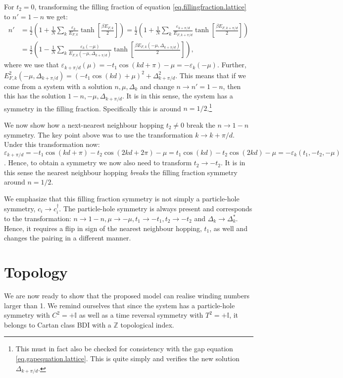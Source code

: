 For $t_2 = 0$, transforming the filling fraction of equation \eqref{eq.fillingfraction.lattice} to $n' = 1 - n$ we get:
\begin{align}
n' 	&= \frac{1}{2}\left(1 + \frac{1}{N}\sum_k \frac{\varepsilon_k}{E_{F,k}}\tanh\left[\frac{\beta E_{F,k}}{2} \right] \right) = \frac{1}{2}\left(1 + \frac{1}{N}\sum_k \frac{\varepsilon_{k + \pi/d}}{E_{F,k + \pi/d}}\tanh\left[\frac{\beta E_{F,k + \pi/d}}{2} \right] \right) \nonumber \\ 
	&= \frac{1}{2}\left(1 - \frac{1}{N}\sum_k \frac{\varepsilon_{k}(-\mu)}{E_{F,k}(-\mu, \Delta_{k + \pi/d})}\tanh\left[\frac{\beta E_{F,k}(-\mu, \Delta_{k + \pi/d})}{2} \right] \right), \nonumber
\end{align}
where we use that $\varepsilon_{k + \pi / d}( \mu ) = -t_1\cos(kd + \pi) - \mu = - \varepsilon_k(-\mu)$. Further, $E^2_{F,k}(-\mu, \Delta_{k + \pi/d}) = (-t_1\cos(kd)+\mu)^2 + \Delta^2_{k+\pi/d}$. This means that if we come from a system with a solution $n, \mu, \Delta_k$ and change $n \to n' = 1 - n$, then this has the solution $1 - n, -\mu, \Delta_{k+\pi/d}$. It is in this sense, the system has a symmetry in the filling fraction. Specifically this is around $n = 1/2$.\footnote{This must in fact also be checked for consistency with the gap equation \eqref{eq.gapequation.lattice}. This is quite simply and verifies the new solution $\Delta_{k + \pi/d}$. } 

We now show how a next-nearest neighbour hopping $t_2 \neq 0$ break the $n \to 1 - n$ symmetry. The key point above was to use the transformation $k\to k + \pi/d$. Under this transformation now: $\varepsilon_{k + \pi/d} = -t_1\cos(kd + \pi) - t_2\cos(2kd + 2\pi) - \mu = t_1\cos(kd) - t_2\cos(2kd) - \mu = -\varepsilon_k(t_1,-t_2,-\mu)$. Hence, to obtain a symmetry we now also need to transform $t_2 \to -t_2$. It is in this sense the nearest neighbour hopping \textit{breaks} the filling fraction symmetry around $n = 1/2$. 

We emphasize that this filling fraction symmetry is not simply a particle-hole symmetry, $c_i \to c^\dagger_i$. The particle-hole symmetry is always present and corresponds to the transformation: $n \to 1 - n, \mu \to -\mu, t_1 \to -t_1, t_2 \to -t_2$ and  $\Delta_k \to \Delta_k^*$. Hence, it requires a flip in sign of the nearest neighbour hopping, $t_1$, as well and changes the pairing in a different manner.  

\section{Topology} \label{sec.topology.lattice}
We are now ready to show that the proposed model can realise winding numbers larger than 1. We remind ourselves that since the system has a particle-hole symmetry with $C^2 = + \mathbb{I}$ as well as a time reversal symmetry with $T^2 = +\mathbb{I}$, it belongs to Cartan class BDI with a $\mathbb{Z}$ topological index. 

